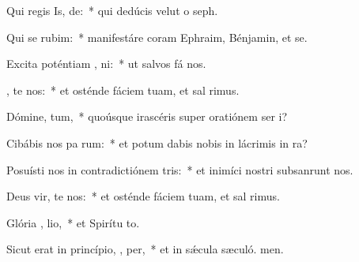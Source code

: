 \item Qui regis Is, de:~* qui dedúcis velut o seph.
\item Qui se  rubim:~* manifestáre coram Ephraim, Bénjamin, et se.
\item Excita poténtiam ,  ni:~* ut salvos fá nos.
\item {}, te nos:~* et osténde fáciem tuam, et sal rimus.
\item Dómine,  tum,~* quoúsque irascéris super oratiónem ser i?
\item Cibábis nos pa rum:~* et potum dabis nobis in lácrimis in ra?
\item Posuísti nos in contradictiónem  tris:~* et inimíci nostri subsanrunt nos.
\item Deus vir, te nos:~* et osténde fáciem tuam, et sal rimus.
\item Glória ,  lio,~* et Spirítu to.
\item Sicut erat in princípio,  ,  per,~* et in sǽcula sæculó. men.
